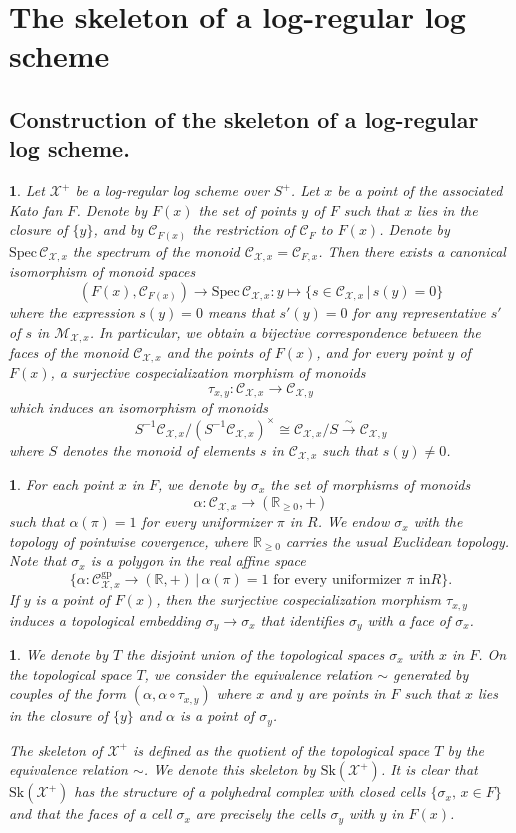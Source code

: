 \documentclass{amsart}%
\numberwithin{equation}{subsection}
\theoremstyle{plain2}
\theoremstyle{definition2}
\theoremstyle{stepstyle}
\theoremstyle{point}
\theoremstyle{subpoint}
\newtheorem{subpoint}[equation]{}%
\newcommand{\spa}[1]{\begin{subpoint}#1\end{subpoint}}           %
\newcommand{\R}{\ensuremath{\mathbb{R}}}
\newcommand{\cX}{\ensuremath{\mathscr{X}}}
\renewcommand{\R}{\ensuremath{\mathbb{R}}}
\newcommand{\Spec}{\ensuremath{\mathrm{Spec}\,}}
\newcommand{\Sk}{\mathrm{Sk}}
\newcommand{\gp}{\mathrm{gp}}
\begin{document}
\section{The skeleton of a log-regular log scheme} \label{sect skeleton log}
\subsection{Construction of the skeleton of a log-regular log scheme.}

\spa{Let $\cX^+$ be a log-regular log scheme over $S^+$. Let $x$ be a point of the associated Kato fan $F$. Denote by $F(x)$ the set of points
$y$ of $F$ such that $x$ lies in the closure of $\{y\}$, and by
$\mathcal{C}_{F(x)}$ the restriction of $\mathcal{C}_F$ to $F(x)$.
Denote
 by $\Spec \mathcal{C}_{\cX,x}$ the spectrum of the monoid
$\mathcal{C}_{\cX,x}=\mathcal{C}_{F,x}$. Then there exists a
canonical isomorphism of
 monoid spaces
$$(F(x),\mathcal{C}_{F(x)})\to \Spec \mathcal{C}_{\cX,x}:y\mapsto \{s\in \mathcal{C}_{\cX,x}\,|\,s(y)= 0\}$$ where the expression $s(y)= 0$ means that $s'(y)= 0$ for any representative $s'$ of $s$ in $\mathcal{M}_{\cX,x}$. In particular, we obtain a bijective correspondence between the faces of the monoid $\mathcal{C}_{\cX,x}$ and the points of $F(x)$, and for every point $y$ of $F(x)$, a surjective cospecialization morphism of monoids $$\tau_{x,y}:\mathcal{C}_{\cX,x}\to \mathcal{C}_{\cX,y}$$ which induces an isomorphism of monoids $$S^{-1}\mathcal{C}_{\cX,x}/(S^{-1}\mathcal{C}_{\cX,x})^{\times}\cong \mathcal{C}_{\cX,x}/S \xrightarrow{\sim}
 \mathcal{C}_{\cX,y}$$ where $S$ denotes the monoid of elements $s$ in $\mathcal{C}_{\cX,x}$ such that $s(y)\neq 0$.}

\spa{For each point $x$ in $F$, we denote by $\sigma_x$ the set of morphisms of monoids $$\alpha:\mathcal{C}_{\cX,x}\to (\R_{\geq 0},+)$$ such that $\alpha(\pi)=1$ for every uniformizer $\pi$ in $R$. We endow $\sigma_x$ with the topology of pointwise covergence, where $\R_{\geq 0}$ carries the usual Euclidean topology. Note that $\sigma_x$ is a polygon in the real affine space
$$\{\alpha:\mathcal{C}^{\gp}_{\cX,x}\to (\R,+)\,|\,\alpha(\pi)=1\mbox{ for every uniformizer }\pi\mbox{ in
}R\}.$$ If $y$ is a point of $F(x)$, then the surjective
cospecialization morphism $\tau_{x,y}$ induces a topological
embedding $\sigma_y\to \sigma_x$ that identifies $\sigma_y$ with a face of $\sigma_x$.}

\spa{We denote by $T$ the disjoint union of the topological
spaces $\sigma_x$ with $x$ in $F$. On the topological space $T$, we consider the equivalence relation $\sim$ generated by couples of the form $(\alpha,\alpha\circ \tau_{x,y})$ where $x$ and $y$ are points in $F$ such that $x$ lies in the closure of $\{y\}$ and $\alpha$ is a point of $\sigma_y$.

The skeleton of $\cX^+$ is defined as the quotient of the topological space $T$ by the equivalence relation $\sim$. We denote this skeleton by $\Sk(\cX^+)$. It is clear that $\Sk(\cX^+)$ has the structure of a polyhedral complex with closed cells $\{\sigma_x,\,x\in F\}$ and that the faces of a cell $\sigma_x$ are precisely the cells $\sigma_y$ with $y$ in $F(x)$. 
}
 
\end{document}
